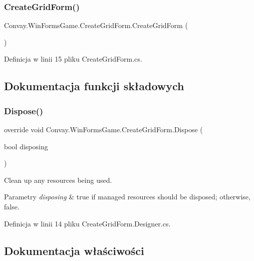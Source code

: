 \subsubsection{\texorpdfstring{Create\+Grid\+Form()}{CreateGridForm()}}
{\footnotesize\ttfamily Convay.\+Win\+Forms\+Game.\+Create\+Grid\+Form.\+Create\+Grid\+Form (\begin{DoxyParamCaption}{ }\end{DoxyParamCaption})}



Definicja w linii 15 pliku Create\+Grid\+Form.\+cs.



\subsection{Dokumentacja funkcji składowych}
\hypertarget{class_convay_1_1_win_forms_game_1_1_create_grid_form_ab7190b04f4d53236f132b7361f874f88}{}\label{class_convay_1_1_win_forms_game_1_1_create_grid_form_ab7190b04f4d53236f132b7361f874f88} 
\subsubsection{\texorpdfstring{Dispose()}{Dispose()}}
{\footnotesize\ttfamily override void Convay.\+Win\+Forms\+Game.\+Create\+Grid\+Form.\+Dispose (\begin{DoxyParamCaption}\item[{bool}]{disposing }\end{DoxyParamCaption})\hspace{0.3cm}{\ttfamily [protected]}}



Clean up any resources being used. 


\begin{DoxyParams}{Parametry}
{\em disposing} & true if managed resources should be disposed; otherwise, false.\\
\hline
\end{DoxyParams}


Definicja w linii 14 pliku Create\+Grid\+Form.\+Designer.\+cs.



\subsection{Dokumentacja właściwości}
\hypertarget{class_convay_1_1_win_forms_game_1_1_create_grid_form_a020c69576703c0e6614d9acb0702b5ec}{}\label{class_convay_1_1_win_forms_game_1_1_create_grid_form_a020c69576703c0e6614d9acb0702b5ec} 
